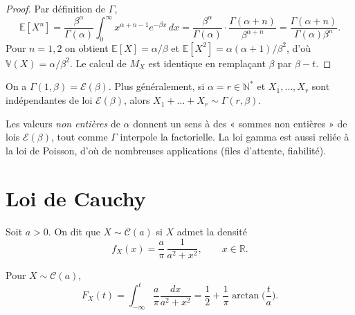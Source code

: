\begin{proof}
Par définition de $\Gamma$,
\[
  \mathbb{E}[X^n]=\frac{\beta^\alpha}{\Gamma(\alpha)}\int_0^\infty x^{\alpha+n-1}
  e^{-\beta x}\,dx
  =\frac{\beta^\alpha}{\Gamma(\alpha)}\cdot\frac{\Gamma(\alpha+n)}{\beta^{\alpha+n}}
  =\frac{\Gamma(\alpha+n)}{\Gamma(\alpha)\beta^n}.
\]
Pour $n=1,2$ on obtient $\mathbb{E}[X]=\alpha/\beta$ et
$\mathbb{E}[X^2]=\alpha(\alpha+1)/\beta^2$, d'où $\mathbb{V}(X)=\alpha/\beta^2$. Le calcul de
$M_X$ est identique en remplaçant $\beta$ par $\beta-t$.
\end{proof}

\begin{mdframed}
\begin{proposition}
On a $\Gamma(1,\beta)=\mathcal{E}(\beta)$. Plus généralement, si $\alpha=r\in\mathbb{N}^*$ et
$X_1,\dots,X_r$ sont indépendantes de loi $\mathcal{E}(\beta)$, alors
$X_1+\dots+X_r\sim\Gamma(r,\beta)$.
\end{proposition}
\end{mdframed}

\begin{remarque}
Les valeurs \emph{non entières} de $\alpha$ donnent un sens à des « sommes non
entières » de lois $\mathcal{E}(\beta)$, tout comme $\Gamma$ interpole la factorielle.
La loi gamma est aussi reliée à la loi de Poisson, d'où de nombreuses
applications (files d'attente, fiabilité).
\end{remarque}

\section{Loi de Cauchy}
\medskip

\begin{mdframed}
\begin{definition}
Soit $a>0$. On dit que $X\sim\mathcal{C}(a)$ si $X$ admet la densité
\[
  f_X(x)=\frac{a}{\pi}\,\frac{1}{a^2+x^2},\qquad x\in\mathbb{R}.
\]
\end{definition}
\end{mdframed}

\medskip

\begin{mdframed}
\begin{proposition}
Pour $X\sim\mathcal{C}(a)$,
\[
  F_X(t)=\int_{-\infty}^t\frac a\pi\frac{dx}{a^2+x^2}
  =\frac12+\frac1\pi\arctan\!\Big(\frac ta\Big).
\]
\end{proposition}
\end{mdframed}

